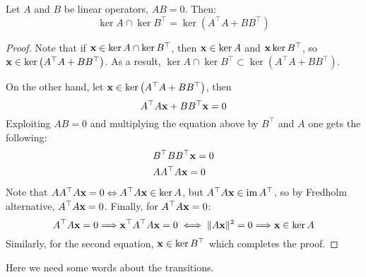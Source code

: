 \begin{lemma}\label{lemma:hodge_kernels}
      Let \( A \) and \( B \) be linear operators, \( A B = 0 \). Then:
      \begin{equation}
            \ker A \cap \ker B^\top = \ker \left( A^\top A + B B^\top \right)
      \end{equation}
      \vspace{-\baselineskip}
\end{lemma}

\begin{proof}
      Note that if \( \mathbf{x} \in \ker A \cap \ker B^\top \), then \( \mathbf{x} \in \ker A \) and \( \mathbf{x} \ker B^\top \), so \( \mathbf{x} \in \ker \left( A^\top A + B B^\top  \right)\). As a result, \( \ker A \cap \ker B^\top \subset \ker \left( A^\top A + B B^\top  \right)\).

      On the other hand, let \( \mathbf{x} \in \ker \left( A^\top A + B B^\top \right)\), then
      \begin{equation}
            A^\top A \mathbf{x}  + B B^\top \mathbf{x} = 0
      \end{equation}
      Exploiting \( A B = 0 \) and multiplying the equation above by \( B^\top \) and \( A \) one gets the following:
      \begin{equation}
            \begin{aligned}
                  & B^\top B B^\top \mathbf{x} = 0 \\
                  & A A^\top A \mathbf{x} = 0 
            \end{aligned}
      \end{equation}
      Note that \( A A^\top A \mathbf{x} = 0 \Leftrightarrow A^\top A \mathbf{x} \in \ker A \), but \( A^\top A \mathbf{x} \in \operatorname{im} A^\top \), so by Fredholm alternative, \( A^\top A \mathbf{x} = 0\). Finally, for \( A^\top A \mathbf{x} = 0\):
      \begin{equation}
             A^\top A \mathbf{x} = 0  \Longrightarrow  \mathbf{x}^\top A^\top A \mathbf{x} = 0 \iff \| A \mathbf{x} \|^2 = 0 \Longrightarrow \mathbf{x} \in \ker A  
      \end{equation}
      Similarly, for the second equation, \( \mathbf{x} \in \ker B^\top \) which completes the proof.
\end{proof}

\begin{tmp}
      Here we need some words about the transitions.
\end{tmp}

